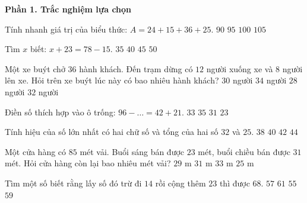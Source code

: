 \textbf{Phần 1. Trắc nghiệm lựa chọn}

\begin{ex} %
Tính nhanh giá trị của biểu thức: $A = 24 + 15 + 36 + 25$.
\choice
{$90$}
{$95$}
{\True $100$}
{$105$}
\end{ex}

\begin{ex} %
Tìm $x$ biết: $x + 23 = 78 - 15$.
\choice
{$35$}
{\True $40$}
{$45$}
{$50$}
\end{ex}

\begin{ex} %
Một xe buýt chở $36$ hành khách. Đến trạm dừng có $12$ người xuống xe và $8$ người lên xe. Hỏi trên xe buýt lúc này có bao nhiêu hành khách?
\choice
{$30$ người}
{$34$ người}
{$28$ người}
{\True $32$ người}
\end{ex}

\begin{ex} %
Điền số thích hợp vào ô trống: $96 - \dots = 42 + 21$.
\choice
{\True $33$}
{$35$}
{$31$}
{$23$}
\end{ex}

\begin{ex} %
Tính hiệu của số lớn nhất có hai chữ số và tổng của hai số $32$ và $25$.
\choice
{$38$}
{$40$}
{\True $42$}
{$44$}
\end{ex}

\begin{ex} %
Một cửa hàng có $85$ mét vải. Buổi sáng bán được $23$ mét, buổi chiều bán được $31$ mét. Hỏi cửa hàng còn lại bao nhiêu mét vải?
\choice
{$29\text{ m}$}
{\True $31\text{ m}$}
{$33\text{ m}$}
{$25\text{ m}$}
\end{ex}

\begin{ex} %
Tìm một số biết rằng lấy số đó trừ đi $14$ rồi cộng thêm $23$ thì được $68$.
\choice
{$57$}
{$61$}
{$55$}
{\True $59$}
\end{ex}

